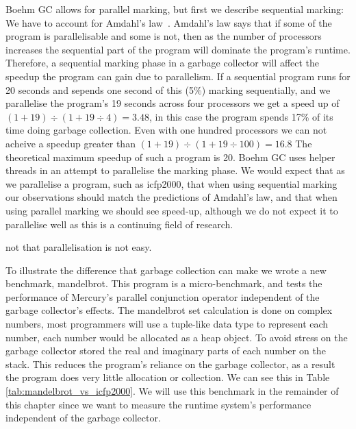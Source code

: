 

Boehm GC allows for parallel marking,
but first we describe sequential marking:
We have to account for Amdahl's law~\citep{amdahl}.
Amdahl's law says that if some of the program is parallelisable and some
is not,
then as the number of processors increases the sequential part of the
program will dominate the program's runtime.
Therefore,
a sequential marking phase in a garbage collector will affect the speedup
the program can gain due to parallelism.
If a sequential program runs for 20 seconds and sepends one second of this
(5\%) marking sequentially,
and we parallelise the program's 19 seconds across four processors we get
a speed up of
$(1 + 19) \div (1 + 19\div4) = 3.48$,
in this case the program spends 17\% of its time doing garbage collection.
Even with one hundred processors we can not acheive a speedup greater than
$(1 + 19) \div (1 + 19\div100) = 16.8$
The theoretical maximum speedup of such a program is 20.
Boehm GC uses helper threads in an attempt to parallelise the marking phase.
We would expect that as we parallelise a program,
such as icfp2000,
that when using sequential marking our observations should match the
predictions of Amdahl's law,
and that when using parallel marking we should see speed-up,
although we do not expect it to parallelise well
as this is a continuing field of research.


not that parallelisation is not easy.





To illustrate the difference that garbage collection can make we wrote a new
benchmark, mandelbrot.
This program is a micro-benchmark, and tests the performance of 
Mercury's parallel conjunction operator independent of the garbage
collector's effects.
The mandelbrot set calculation is done on complex numbers,
most programmers will use a tuple-like data type to represent each number,
each number would be allocated as a heap object.
To avoid stress on the garbage collector stored the real and imaginary parts
of each number on the stack.
This reduces the program's reliance on the garbage collector,
as a result the program does very little allocation or collection.
We can see this in Table \ref{tab:mandelbrot_vs_icfp2000}.
We will use this benchmark in the remainder of this chapter since we want to
measure the runtime system's performance independent of the garbage collector.

